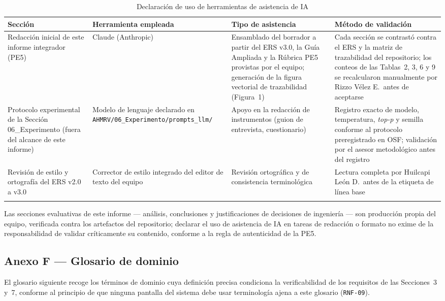 \documentclass[11pt,a4paper]{article}
\newcommand{\id}[1]{\texttt{#1}}
\begin{document}
\begin{longtable}{|L{2.6cm}|L{3.6cm}|L{3.4cm}|L{3.4cm}|}
\hline
{}\textbf{Sección} & \textbf{Herramienta empleada} & \textbf{Tipo de asistencia} & \textbf{Método de validación} \\
\hline
\endhead
Redacción inicial de este informe integrador (PE5) & Claude (Anthropic) & Ensamblado del borrador
a partir del ERS v3.0, la Guía Ampliada y la Rúbrica PE5 provistas por el equipo; generación de la
figura vectorial de trazabilidad (Figura~1) & Cada sección se contrastó contra el ERS y la matriz
de trazabilidad del repositorio; los conteos de las Tablas~2, 3, 6 y 9 se recalcularon manualmente
por Rizzo Vélez E.\ antes de aceptarse \\ \hline
Protocolo experimental de la Sección 06\_Experimento (fuera del alcance de este informe) &
Modelo de lenguaje declarado en \id{AHMRV/06\_Experimento/prompts\_llm/} & Apoyo en la redacción
de instrumentos (guion de entrevista, cuestionario) & Registro exacto de modelo, temperatura,
\emph{top-p} y semilla conforme al protocolo preregistrado en OSF; validación por el asesor
metodológico antes del registro \\ \hline
Revisión de estilo y ortografía del ERS v2.0 a v3.0 & Corrector de estilo integrado del editor de
texto del equipo & Revisión ortográfica y de consistencia terminológica & Lectura completa por
Huilcapi León D.\ antes de la etiqueta de línea base \\ \hline
\caption{Declaración de uso de herramientas de asistencia de IA}
\end{longtable}

\noindent\small Las secciones evaluativas de este informe --- análisis, conclusiones y
justificaciones de decisiones de ingeniería --- son producción propia del equipo, verificada
contra los artefactos del repositorio; declarar el uso de asistencia de IA en tareas de redacción
o formato no exime de la responsabilidad de validar críticamente su contenido, conforme a la
regla de autenticidad de la PE5.

\subsection*{Anexo F --- Glosario de dominio}

El glosario siguiente recoge los términos de dominio cuya definición precisa condiciona la
verificabilidad de los requisitos de las Secciones~3 y~7, conforme al principio de que ninguna
pantalla del sistema debe usar terminología ajena a este glosario (\id{RNF-09}).
\end{document}
